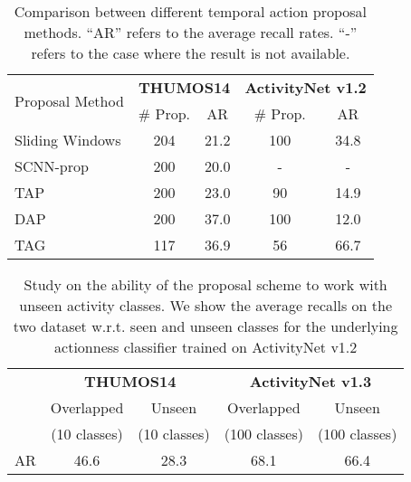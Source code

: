 \documentclass[10pt,twocolumn,letterpaper]{article}
\begin{document}
\begin{table}[h]
	\begin{center}
		\begin{tabular}{l|c|c|c|c}
			\hline 
			\multirow{2}{*}{Proposal Method}& \multicolumn{2}{|c|}{\textbf{THUMOS14}}  & \multicolumn{2}{|c}{\textbf{ActivityNet v1.2}} \\ 
			\cline{2-5}
			& \# Prop. & AR & \# Prop. & AR \\
			\hline 
			Sliding Windows&  204  & 21.2 & 100 & 34.8\\  
			\hline
			SCNN-prop~\cite{Shou2016SCNN} & 200 & 20.0 & - & - \\
			\hline
			TAP~\cite{caba2016cvpr}& 200  & 23.0  & 90  & 14.9 \\  
			\hline
			DAP~\cite{Escorcia2016DAP}& 200 & 37.0 &100 & 12.0  \\ 
			\hline\hline
			TAG & 117 & 36.9 & 56 & 66.7 \\ 
			\hline 
		\end{tabular} 
	\end{center}
	\caption{Comparison between different temporal action proposal methods. ``AR'' refers to the average recall rates. ``-'' refers to the case where the result is not available.}
	\label{table:proposals}
\end{table}

\begin{table}[h]
	\small
	\begin{center}
\begin{tabular}{c|c|c|c|c}
	\hline
	& \multicolumn{2}{c|}{\textbf{THUMOS14}} & \multicolumn{2}{c}{\textbf{ActivityNet v1.3}} \\ \cline{2-5}
	& Overlapped    & Unseen & Overlapped       & Unseen    \\
	& (10 classes)  & (10 classes)   & (100 classes)    & (100 classes)     \\ \hline
	AR & 46.6          & 28.3           & 68.1             & 66.4              \\ \hline
\end{tabular}
\end{center}
\caption{Study on the ability of the proposal scheme to work with unseen activity classes. We show the average recalls on the two dataset w.r.t. seen and unseen classes for the underlying actionness classifier trained on ActivityNet v1.2}
\label{table:actionness}
\end{table}
\end{document}
